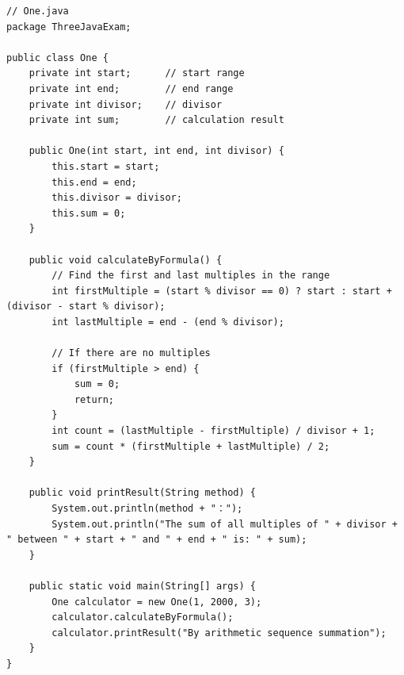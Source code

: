 \documentclass[12pt,a4paper]{article}
\begin{document}
\begin{lstlisting}
// One.java
package ThreeJavaExam;

public class One {
    private int start;      // start range
    private int end;        // end range
    private int divisor;    // divisor
    private int sum;        // calculation result
    
    public One(int start, int end, int divisor) {
        this.start = start;
        this.end = end;
        this.divisor = divisor;
        this.sum = 0;
    }
    
    public void calculateByFormula() {
        // Find the first and last multiples in the range
        int firstMultiple = (start % divisor == 0) ? start : start + (divisor - start % divisor);
        int lastMultiple = end - (end % divisor);
        
        // If there are no multiples
        if (firstMultiple > end) {
            sum = 0;
            return;
        }
        int count = (lastMultiple - firstMultiple) / divisor + 1;
        sum = count * (firstMultiple + lastMultiple) / 2;
    }

    public void printResult(String method) {
        System.out.println(method + "：");
        System.out.println("The sum of all multiples of " + divisor + " between " + start + " and " + end + " is: " + sum);
    }

    public static void main(String[] args) {
        One calculator = new One(1, 2000, 3);
        calculator.calculateByFormula();
        calculator.printResult("By arithmetic sequence summation");
    }
}
\end{lstlisting}
\end{document}
